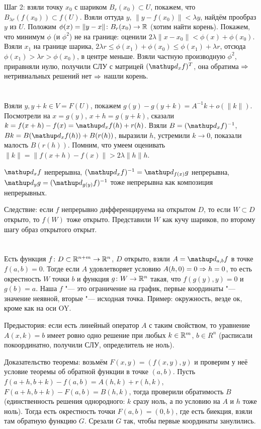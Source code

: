 Шаг 2: взяли точку $x_0$ с шариком $B_r(x_0) \subset U$, покажем, что $B_{\lambda r}(f(x_0)) \subset f(U)$.
Взяли оттуда $y$, $\|y - f(x_0)\| < \lambda y$, найдём прообраз $y$ из $U$.
Положим $\phi(x) = \|y - x\| \colon B_r(x_0) \to \mathbb{R}$ (хотим найти корень).
Покажем, что минимум $\phi$ (и $\phi^2$) не на границе: оценили $2\lambda\|x - x_0\| < \phi(x) + \phi(x_0)$.
Взяли $x_1$ на границе шарика, $2\lambda r \le \phi(x_1) + \phi(x_0) \le \phi(x_1) + \lambda r$, отсюда $\phi(x_1) > \lambda r > \phi(x_0)$, в центре меньше.
Взяли частную производную $\phi^2$, приравняли нулю, получили СЛУ с матрицей $(\d_x f)^T$, она обратима $\Rightarrow$ нетривиальных решений нет $\Rightarrow$ нашли корень.

\section{} %
Взяли $y, y + k \in V = F(U)$, покажем $g(y) - g(y+k) = A^{-1}k + o(\|k\|)$.
Посмотрели на $x=g(y)$, $x+h=g(y+k)$, сказали $k=f(x+h)-f(x)=\d_xf(h) + r(h)$.
Взяли $B=(\d_xf)^{-1}$, $Bk=B(\d_xf(h))+B(r(h))$, выразили $h$, устремили $k \to 0$, показали малость $B(r(h))$.
Помним, что умеем оценивать $\|k\| = \|f(x+h)-f(x)\| > 2\lambda\|h\|h$.

$\d_x f$ непрерывна, $(\d_x f)^{-1}=\d_{f(x)} g$ непрерывна, $\d_y g = (\d_{g(y)} f)^{-1}$ тоже непрерывна как композиция непрерывных.

Следствие: если $f$ непрерывно дифференцируема на открытом $D$, то если $W \subset D$ открыто, то $f(W)$ тоже открыто.
Представили $W$ как кучу шариков, по второму шагу образ открытого открыт.

\section{} %
Есть функция $f \colon D \subset \mathbb{R}^{n+m} \to \mathbb{R}^n$, $D$ открыто, взяли $A=\d_{a,b} f$ в точке $f(a, b)=0$.
Тогде если $A$ удовлетворяет условию $A(h, 0) = 0 \Rightarrow h = 0$, то есть окрестность $W$ точки $b$ и функция $g \colon W \to \mathbb{R}^n$ такая,
что $f(g(y), y) = 0$ и $g(b)=a$.
Наша $f$ "--- это ограничение на график, первые координаты "--- значение неявной, вторые "--- исходная точка.
Пример: окружность, везде ок, кроме как на оси OY.

Предыстория: если есть линейный оператор $A$ с таким свойством, то уравнение $A(x, k)=b$ имеет ровно одно решение при любых $k \in \mathbb{R}^m$, $b \in R^n$ (расписали покоординатно, получили СЛУ, определитель не ноль).

Доказательство теоремы: возьмём $F(x, y) = (f(x, y), y)$ и проверим у неё условие теоремы об обратной функции в точке $(a, b)$.
Пусть $f(a+h, b+k)-f(a,b)=A(h, k) + r(h, k)$, $F(a+h,b+k)-F(a,b)=B(h, k)$, тогда проверили обратимость $B$ (единственность решения однородного: $k$ сразу ноль, а по условию на $A$ и $h$ тоже ноль).
Тогда есть окрестность точки $F(a, b)=(0,b)$, где есть биекция, взяли там обратную функцию $G$.
Срезали $G$ так, чтобы первые координаты занулились.

